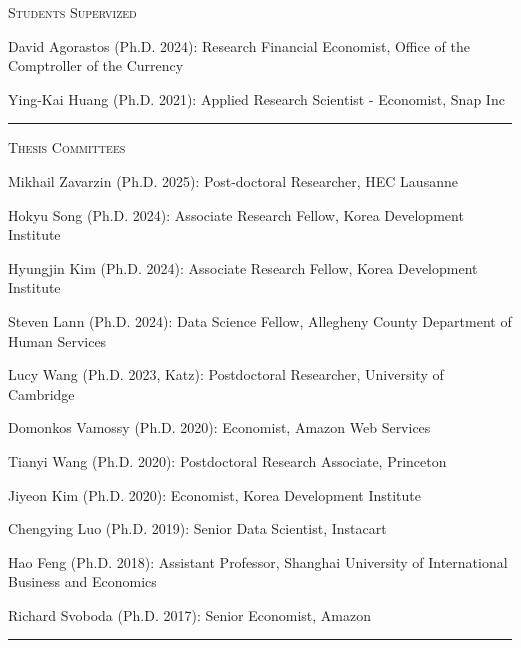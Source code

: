 \documentclass{article}
\begin{document}
\parbox{\textwidth}{
\parbox[t]{0.28\textwidth}{ \raggedright \noindent \textsc{ Students Supervized } }
\parbox[t]{0.72\textwidth}{ \raggedright

David Agorastos (Ph.D. 2024): Research Financial Economist, Office of the Comptroller of the Currency
\vspace{0.27cm}

Ying-Kai Huang (Ph.D. 2021): Applied Research Scientist - Economist, Snap Inc
\vspace{0.27cm}

}
\textcolor{light-gray}{\hrule}
}
\vspace{0.3cm}

\parbox{\textwidth}{
\parbox[t]{0.28\textwidth}{ \raggedright \noindent \textsc{ Thesis Committees } }
\parbox[t]{0.72\textwidth}{ \raggedright

Mikhail Zavarzin (Ph.D. 2025): Post-doctoral Researcher, HEC Lausanne
\vspace{0.27cm}

Hokyu Song (Ph.D. 2024): Associate Research Fellow, Korea Development Institute
\vspace{0.27cm}

Hyungjin Kim (Ph.D. 2024): Associate Research Fellow, Korea Development Institute
\vspace{0.27cm}

Steven Lann (Ph.D. 2024): Data Science Fellow, Allegheny County Department of Human Services
\vspace{0.27cm}

Lucy Wang (Ph.D. 2023, Katz): Postdoctoral Researcher, University of Cambridge
\vspace{0.27cm}

Domonkos Vamossy (Ph.D. 2020): Economist, Amazon Web Services
\vspace{0.27cm}

Tianyi Wang (Ph.D. 2020): Postdoctoral Research Associate, Princeton
\vspace{0.27cm}

Jiyeon Kim (Ph.D. 2020): Economist, Korea Development Institute
\vspace{0.27cm}

Chengying Luo (Ph.D. 2019): Senior Data Scientist, Instacart
\vspace{0.27cm}

Hao Feng (Ph.D. 2018): Assistant Professor, Shanghai University of International Business and Economics
\vspace{0.27cm}

Richard Svoboda (Ph.D. 2017): Senior Economist, Amazon
\vspace{0.27cm}

}
\textcolor{light-gray}{\hrule}
}
\vspace{0.3cm}
\end{document}
